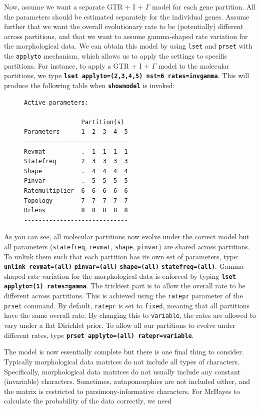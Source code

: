 \documentclass[12pt]{book}
\newcommand{\ttt}[1]{\texttt{#1}}
\newcommand{\tb}[1]{\ttt{\textbf{#1}}}
\begin{document}
Now, assume we want a separate GTR + I + $\Gamma$ model for each gene partition. All the parameters
should be estimated separately for the individual genes. Assume further that we want the overall
evolutionary rate to be (potentially) different across partitions, and that we want to assume
gamma-shaped rate variation for the morphological data. We can obtain this model by using
\texttt{lset} and \texttt{prset} with the \texttt{applyto} mechanism, which allows us to apply the settings
to specific partitions. For instance, to apply a GTR + I + $\Gamma$ model to the molecular partitions,
we type \tb{lset applyto=(2,3,4,5) nst=6 rates=invgamma}. This will produce the following table
when \tb{showmodel} is invoked:\newpage

\begin{figure}\singlespacing\footnotesize
\begin{verbatim}
Active parameters:
 
                Partition(s)
Parameters      1  2  3  4  5
-----------------------------
Revmat          .  1  1  1  1
Statefreq       2  3  3  3  3
Shape           .  4  4  4  4
Pinvar          .  5  5  5  5
Ratemultiplier  6  6  6  6  6
Topology        7  7  7  7  7
Brlens          8  8  8  8  8
-----------------------------
\end{verbatim}\end{figure}

As you can see, all molecular partitions now evolve under the correct model but all parameters
(\texttt{statefreq}, \texttt{revmat}, \texttt{shape}, \texttt{pinvar}) are shared across partitions. 
To unlink them such that each partition has its own set of parameters, type: \tb{unlink revmat=(all)}
\tb{pinvar=(all)} \tb{shape=(all)} \tb{statefreq=(all)}. Gamma-shaped rate variation for the morphological
data is enforced by typing \tb{lset applyto=(1) rates=gamma}. The trickiest part is to allow the overall
rate to be different across partitions. This is achieved using the \texttt{ratepr} parameter of the
\ttt{prset} command. By default, \texttt{ratepr} is set to \texttt{fixed}, meaning that all partitions
have the same overall rate. By changing this to \texttt{variable}, the rates are allowed to vary under
a flat Dirichlet prior. To allow all our partitions to evolve under different rates, type \tb{prset
applyto=(all) ratepr=variable}.

The model is now essentially complete but there is one final thing to consider. Typically
morphological data matrices do not include all types of characters. Specifically, morphological
data matrices do not usually include any constant (invariable) characters. Sometimes,
autapomorphies are not included either, and the matrix is restricted to parsimony-informative
characters. For MrBayes to calculate the probability of the data correctly, we need 
\end{document}

